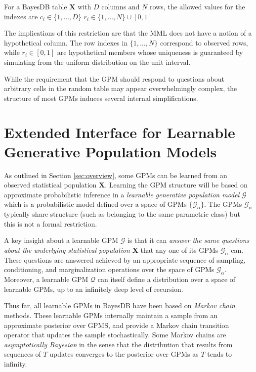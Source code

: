 \documentclass[10pt,letterpaper]{article}
\newcommand{\set}[1]{\{#1\}}
\begin{document}
For a BayesDB table $\mathbf{X}$ with $D$ columns and $N$ rows, the allowed
values for the indexes are
    \subitem $c_i \in \set{1,\dots,D}$
    \subitem $r_i \in \set{1,\dots,N} \cup [0,1]$

The implications of this restriction are that the MML does not have a notion of
a hypothetical column. The row indexes in $\set{1,\dots,N}$ correspond to
observed rows, while $r_i \in [0,1]$ are hypothetical members whose uniqueness
is guaranteed by simulating from the uniform distribution on the unit interval.

While the requirement that the GPM should respond to questions about arbitrary
cells in the random table may appear overwhelmingly complex, the structure of
most GPMs induces several internal simplifications.

\section{Extended Interface for Learnable Generative Population Models}
\label{sec:learnable_gpm}

As outlined in Section \ref{sec:overview}, some GPMs can be learned from an
observed statistical population $\mathbf{X}$. Learning the GPM structure will be
based on approximate probabilistic inference in a \textit{learnable generative
population model} $\mathcal{G}$ which is a probabilistic model defined over a
space of GPMs $\set{\mathcal{G_\alpha}}$. The GPMs $\mathcal{G}_\alpha$
typically share structure (such as belonging to the same parametric class) but
this is not a formal restriction.

A key insight about a learnable GPM $\mathcal{G}$ is that it can \textit{answer
the same questions about the underlying statistical population} $\mathbf{X}$
that any one of its GPMs $\mathcal{G}_\alpha$ can. These questions are answered
achieved by an appropriate sequence of sampling, conditioning, and
marginalization operations over the space of GPMs $\mathcal{G}_\alpha$.
Moreover, a learnable GPM $\mathcal{Q}$ can itself define a distribution over a
space of learnable GPMs, up to an infinitely deep level of recursion.

Thus far, all learnable GPMs in BayesDB have been based on \textit{Markov chain}
methods. These learnable GPMs internally maintain a sample from an approximate
posterior over GPMS, and provide a Markov chain transition operator that updates
the sample stochastically. Some Markov chains are \textit{asymptotically
Bayesian} in the sense that the distribution that results from sequences of $T$
updates converges to the posterior over GPMs as $T$ tends to infinity.
\end{document}

